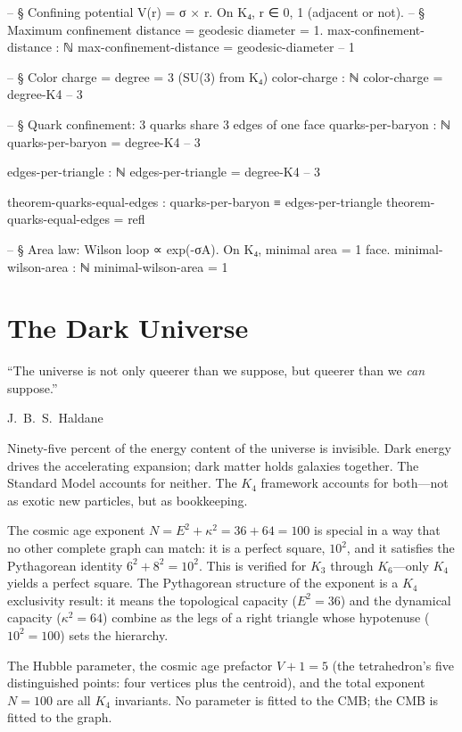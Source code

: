 \documentclass[11pt,a4paper]{book}
\begin{document}
\begin{code}
-- § Confining potential V(r) = σ × r. On K₄, r ∈ {0, 1} (adjacent or not).
-- § Maximum confinement distance = geodesic diameter = 1.
max-confinement-distance : ℕ
max-confinement-distance = geodesic-diameter  -- 1

-- § Color charge = degree = 3 (SU(3) from K₄)
color-charge : ℕ
color-charge = degree-K4  -- 3

-- § Quark confinement: 3 quarks share 3 edges of one face
quarks-per-baryon : ℕ
quarks-per-baryon = degree-K4  -- 3

edges-per-triangle : ℕ
edges-per-triangle = degree-K4  -- 3

theorem-quarks-equal-edges : quarks-per-baryon ≡ edges-per-triangle
theorem-quarks-equal-edges = refl

-- § Area law: Wilson loop ∝ exp(-σA). On K₄, minimal area = 1 face.
minimal-wilson-area : ℕ
minimal-wilson-area = 1
\end{code}

\chapter{The Dark Universe}
\label{ch:dark-universe}

\epigraph{``The universe is not only queerer than we suppose, but queerer than we \emph{can} suppose.''}{J.~B.~S.~Haldane}

Ninety-five percent of the energy content of the universe is invisible. Dark energy drives the accelerating expansion; dark matter holds galaxies together. The Standard Model accounts for neither. The $K_4$ framework accounts for both---not as exotic new particles, but as bookkeeping.

The cosmic age exponent $N = E^2 + \kappa^2 = 36 + 64 = 100$ is special in a way that no other complete graph can match: it is a perfect square, $10^2$, and it satisfies the Pythagorean identity $6^2 + 8^2 = 10^2$. This is verified for $K_3$ through $K_6$---only $K_4$ yields a perfect square. The Pythagorean structure of the exponent is a $K_4$ exclusivity result: it means the topological capacity ($E^2 = 36$) and the dynamical capacity ($\kappa^2 = 64$) combine as the legs of a right triangle whose hypotenuse ($10^2 = 100$) sets the hierarchy.

The Hubble parameter, the cosmic age prefactor $V + 1 = 5$ (the tetrahedron's five distinguished points: four vertices plus the centroid), and the total exponent $N = 100$ are all $K_4$ invariants. No parameter is fitted to the CMB; the CMB is fitted to the graph.
\end{document}
